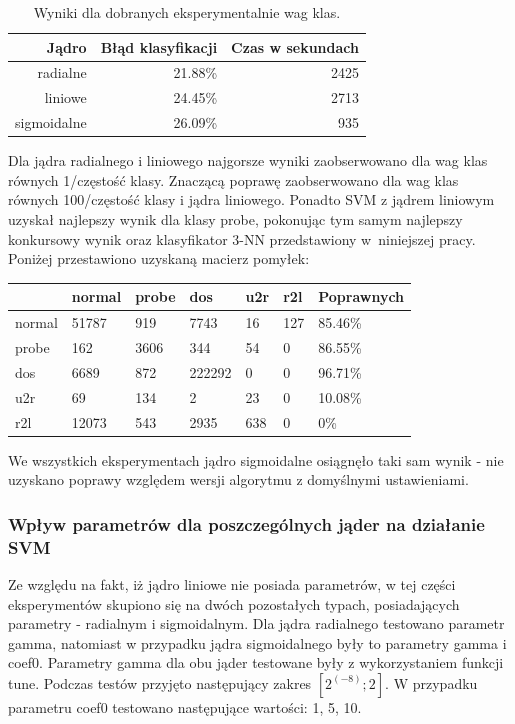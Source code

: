 \documentclass[a4paper, 12pt]{article}
\begin{document}
\begin{table}[H]
\centering
\begin{tabular}{ | r | r | r | } \hline
Jądro & Błąd klasyfikacji & Czas w sekundach \\ \hline
radialne & 21.88\% & 2425 \\ \hline
liniowe & 24.45\% & 2713 \\ \hline
sigmoidalne & 26.09\% & 935 \\ \hline
\end{tabular} 
\caption{Wyniki dla dobranych eksperymentalnie wag klas.}
\end{table}

Dla jądra radialnego i liniowego najgorsze wyniki zaobserwowano dla wag klas równych 1/częstość klasy. Znaczącą poprawę zaobserwowano dla wag klas równych 100/częstość klasy i jądra liniowego. Ponadto SVM z jądrem liniowym uzyskał najlepszy wynik dla klasy probe, pokonując tym samym najlepszy konkursowy wynik oraz klasyfikator 3-NN przedstawiony w~niniejszej pracy. Poniżej przestawiono uzyskaną macierz pomyłek:
\begin{table}[H]
\centering
\begin{tabular}{ | l | l | l | l | l | l | l | } \hline
	& normal & probe & dos 	& u2r 	& r2l 	& Poprawnych	\\ \hline
normal &  51787 &  919 & 7743  &  16 & 127  & 85.46\% \\ \hline
probe  &  162 & 3606 &   344 &   54 &   0 & 86.55\% \\ \hline
dos    &  6689 &  872 & 222292 &   0 &  0 & 96.71\% \\ \hline
u2r    &    69 &  134 &  2 &  23 &  0 & 10.08\% \\ \hline
r2l    &  12073 &  543 &   2935 & 638 &  0 & 0\% \\ \hline
\end{tabular} 
\end{table}
We wszystkich eksperymentach jądro sigmoidalne osiągnęło taki sam wynik - nie uzyskano poprawy względem wersji algorytmu z domyślnymi ustawieniami.

\subsubsection{Wpływ parametrów dla poszczególnych jąder na działanie SVM}
Ze względu na fakt, iż jądro liniowe nie posiada parametrów, w tej części eksperymentów skupiono się na dwóch pozostałych typach, posiadających parametry - radialnym i sigmoidalnym.
Dla jądra radialnego testowano parametr gamma, natomiast w przypadku jądra sigmoidalnego były to parametry gamma i coef0. 
Parametry gamma dla obu jąder testowane były z wykorzystaniem funkcji tune. Podczas testów przyjęto następujący zakres $[2^{(-8)};2]$. W przypadku parametru coef0 testowano następujące wartości: 1, 5, 10.
\end{document}
